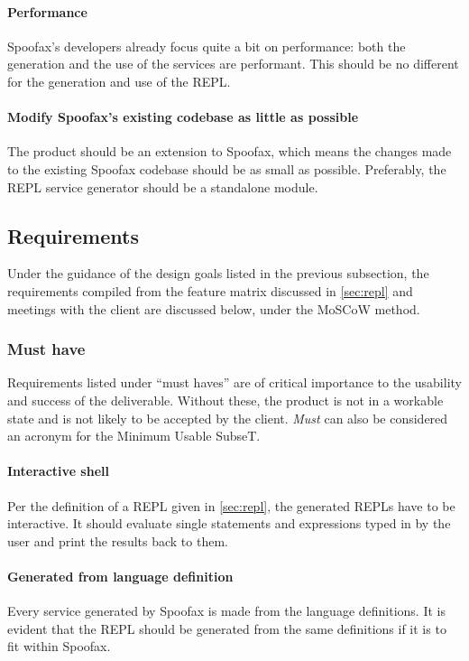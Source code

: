 \paragraph{Performance} Spoofax's developers already focus quite a bit on
performance: both the generation and the use of the services are performant.
This should be no different for the generation and use of the REPL.

\paragraph{Modify Spoofax's existing codebase as little as possible} The product
should be an extension to Spoofax, which means the changes made to the existing
Spoofax codebase should be as small as possible. Preferably, the REPL service
generator should be a standalone module.

\subsection{Requirements}
\label{ssec:requirements}

Under the guidance of the design goals listed in the previous subsection, the
requirements compiled from the feature matrix discussed in \cref{sec:repl} and
meetings with the client are discussed below, under the MoSCoW method.

\subsubsection{Must have}

Requirements listed under ``must haves'' are of critical importance to the
usability and success of the deliverable. Without these, the product is not in a
workable state and is not likely to be accepted by the client. \textit{Must} can
also be considered an acronym for the Minimum Usable SubseT.

\paragraph{Interactive shell} Per the definition of a REPL given in
\cref{sec:repl}, the generated REPLs have to be interactive. It should evaluate
single statements and expressions typed in by the user and print the results
back to them.

\paragraph{Generated from language definition} Every service generated by
Spoofax is made from the language definitions. It is evident that the REPL
should be generated from the same definitions if it is to fit within Spoofax.

